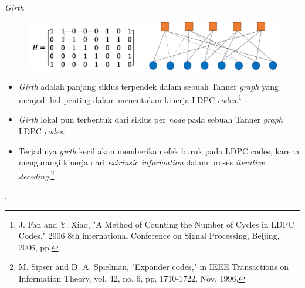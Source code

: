 \documentclass[11pt, aspectratio=169]{beamer}
\begin{document}
\begin{frame}{\textit{Girth}}
\begin{figure}
	\centering 
	\includegraphics[scale=0.6]{gambarafa/GirthH}
	\centering 
\end{figure}
\begin{itemize}
	\item \textit{Girth} adalah panjang siklus terpendek dalam sebuah Tanner \textit{graph} yang menjadi hal penting dalam menentukan kinerja LDPC \textit{codes}.\footnote[1]{\tiny J. Fan and Y. Xiao, "A Method of Counting the Number of Cycles in LDPC Codes," 2006 8th international Conference on Signal Processing, Beijing, 2006, pp.}  
	\item \textit{Girth} lokal pun terbentuk dari siklus per \textit{node} pada sebuah Tanner \textit{graph} LDPC \textit{codes}.  
	\item Terjadinya \textit{girth} kecil akan memberikan efek buruk pada LDPC codes, karena mengurangi kinerja dari \textit{extrinsic information} dalam proses \textit{iterative decoding}.\footnote[2]{\tiny M. Sipser and D. A. Spielman, "Expander codes," in IEEE Transactions on Information Theory, vol. 42, no. 6, pp. 1710-1722, Nov. 1996.}  
	
\end{itemize}

.

\end{frame}
\end{document}
